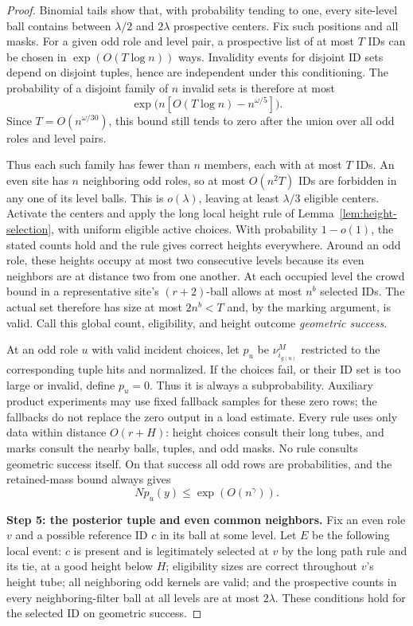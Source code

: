 \begin{proof}
Binomial tails show that, with probability tending to one, every
site-level ball contains between \(\lambda/2\) and \(2\lambda\)
prospective centers. Fix such positions and all masks. For a given odd
role and level pair, a prospective list of at most \(T\) IDs can be
chosen in \(\exp(O(T\log n))\) ways. Invalidity events for disjoint ID
sets depend on disjoint tuples, hence are independent under this
conditioning. The probability of a disjoint family of \(n\) invalid
sets is therefore at most
\[
 \exp\bigl(n[O(T\log n)-n^{\omega/5}]\bigr).
\]
Since \(T=O(n^{\omega/30})\), this bound still tends to zero after the
union over all odd roles and level pairs.

Thus each such family has fewer than \(n\) members, each with at most
\(T\) IDs. An even site has \(n\) neighboring odd roles, so at most
\(O(n^2T)\) IDs are forbidden in any one of its level balls. This is
\(o(\lambda)\), leaving at least \(\lambda/3\) eligible centers.
Activate the centers and apply the long local height rule of
Lemma~\ref{lem:height-selection}, with uniform eligible active choices.
With probability \(1-o(1)\), the stated counts hold and the rule gives
correct heights everywhere. Around an odd role, these heights occupy at
most two consecutive levels because its even neighbors are at distance
two from one another. At each occupied level the crowd bound in a
representative site's \((r+2)\)-ball allows at most \(n^b\) selected
IDs. The actual set therefore has size at most \(2n^b<T\) and, by the
marking argument, is valid. Call this global count, eligibility, and
height outcome \emph{geometric success}.

At an odd role \(u\) with valid incident choices, let \(p_u\) be
\(\nu_{i_{g(u)}}^M\) restricted to the corresponding tuple hits and
normalized. If the choices fail, or their ID set is too large or invalid,
define \(p_u=0\). Thus it is always a subprobability. Auxiliary product
experiments may use fixed fallback samples for these zero rows; the
fallbacks do not replace the zero output in a load estimate. Every rule
uses only data within distance \(O(r+H)\): height choices consult their
long tubes, and marks consult the nearby balls, tuples, and odd masks.
No rule consults geometric success itself. On that success all odd rows
are probabilities, and the retained-mass bound always gives
\[
 Np_u(y)\le\exp(O(n^\gamma)).
\]

\noindent\textbf{Step 5: the posterior tuple and even common neighbors.}\quad
Fix an even role \(v\) and a possible reference ID \(c\) in its ball
at some level. Let \(E\) be the following local event: \(c\) is present
and is legitimately selected at \(v\) by the long path rule and its tie,
at a good height below \(H\); eligibility sizes are correct throughout
\(v\)'s height tube; all neighboring odd kernels are valid; and the
prospective counts in every neighboring-filter ball at all levels are
at most \(2\lambda\). These conditions hold for the selected ID on
geometric success.


\end{proof}
